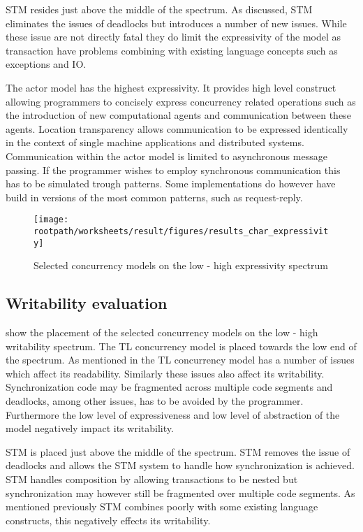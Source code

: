 \ac{STM} resides just above the middle of the spectrum. As discussed, \ac{STM} eliminates the issues of deadlocks but introduces a number of new issues. While these issue are not directly fatal they do limit the expressivity of the model as transaction have problems combining with existing language concepts such as exceptions and \ac{IO}.

The actor model has the highest expressivity. It provides high level construct allowing programmers to concisely express concurrency related operations such as the introduction of new computational agents and communication between these agents. Location transparency allows communication to be expressed identically in the context of single machine applications and distributed systems. Communication within the actor model is limited to asynchronous message passing. If the programmer wishes to employ synchronous communication this has to be simulated trough patterns. Some implementations do however have build in versions of the most common patterns, such as request-reply.

\begin{figure}[htbp]
\centering
 \texttt{[image: \\rootpath/worksheets/result/figures/results\_char\_expressivity]} 
 \caption{Selected concurrency models on the low - high expressivity spectrum}
\label{fig:results_char_expressivity}
\end{figure}

\subsection{Writability evaluation}
 show the placement of the selected concurrency models on the low - high writability spectrum. The \ac{TL} concurrency model is placed towards the low end of the spectrum. As mentioned in  the \ac{TL} concurrency model has a number of issues which affect its readability. Similarly these issues also affect its writability. Synchronization code may be fragmented across multiple code segments and deadlocks, among other issues, has to be avoided by the programmer. Furthermore the low level of expressiveness and low level of abstraction of the model negatively impact its writability.

\ac{STM} is placed just above the middle of the spectrum. \ac{STM} removes the issue of deadlocks and allows the \ac{STM} system to handle how synchronization is achieved. \ac{STM} handles composition by allowing transactions to be nested but synchronization may however still be fragmented over multiple code segments. As mentioned previously \ac{STM} combines poorly with some existing language constructs, this negatively effects its writability.

